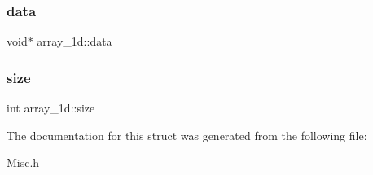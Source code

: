 \subsubsection{\texorpdfstring{data}{data}}
{\footnotesize\ttfamily void$\ast$ array\+\_\+1d\+::data}

\mbox{\label{structarray__1d_acec21fd8404b40eb2b39d5880a6afc45_acec21fd8404b40eb2b39d5880a6afc45}} 
\subsubsection{\texorpdfstring{size}{size}}
{\footnotesize\ttfamily int array\+\_\+1d\+::size}



The documentation for this struct was generated from the following file\+:\begin{DoxyCompactItemize}
\item 
\hyperlink{Misc_8h}{Misc.\+h}\end{DoxyCompactItemize}
